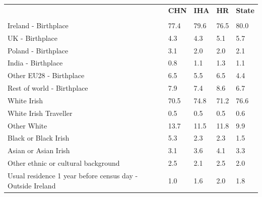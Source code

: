 \documentclass{article}
\begin{document}
\pagebreak
\begin{table}[h]	
\centering
		\begin{tabular}{KTTTT}
  \hline
& \textbf{CHN} & \textbf{IHA} & \textbf{HR}& \textbf{State}\\ 
  \hline
    \\ 
    \hline
Ireland - Birthplace & 77.4& 79.6& 76.5& 80.0\\
UK - Birthplace & 4.3& 4.3& 5.1& 5.7\\
Poland - Birthplace & 3.1& 2.0& 2.0& 2.1\\
India - Birthplace & 0.8& 1.1& 1.3& 1.1\\
Other EU28 - Birthplace & 6.5& 5.5& 6.5& 4.4\\
Rest of world - Birthplace & 7.9& 7.4& 8.6& 6.7\\
    \hline
White Irish & 70.5& 74.8& 71.2& 76.6\\
White Irish Traveller & 0.5& 0.5& 0.5& 0.6\\
Other White & 13.7& 11.5& 11.8&  9.9\\
Black or Black Irish & 5.3& 2.3& 2.3& 1.5\\
Asian or Asian Irish & 3.1& 3.6& 4.1& 3.3\\
Other ethnic or cultural background & 2.5& 2.1& 2.5& 2.0\\
    \hline
Usual residence 1 year before census day - Outside Ireland & 1.0& 1.6& 2.0& 1.8\\


\end{tabular}
\end{table}
\end{document}
